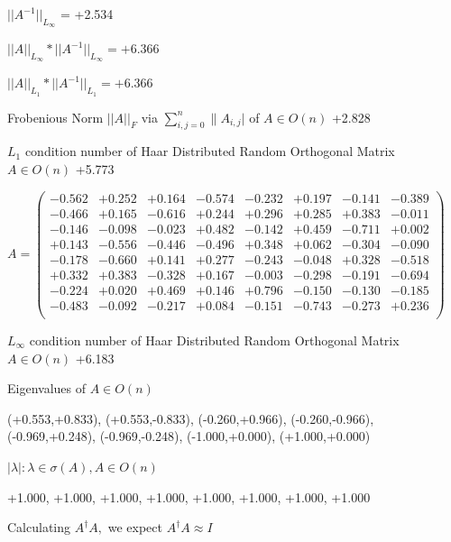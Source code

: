 \documentclass[9pt]{article}
\theoremstyle{plain}
\theoremstyle{definition}
\theoremstyle{remark}
\numberwithin{equation}{section}
\begin{document}
$||A^{-1}||_{L_{\infty}}$ = +2.534

$||A||_{L_{\infty}} * ||A^{-1}||_{L_{\infty}} = +6.366$

$||A||_{L_1} * ||A^{-1}||_{L_1} = +6.366$

Frobenious Norm  $||A||_{\textit{F}}$ via $\sum\limits_{i,j =0}^{n} \|A_{i,j}|$   of  $A \in O(n)$  +2.828

$L_1$ condition number of Haar Distributed Random Orthogonal Matrix $A \in O(n)$ +5.773

$A = \left(
\begin{array}{
cccccccc}
-0.562 & +0.252 & +0.164 & -0.574 & -0.232 & +0.197 & -0.141 & -0.389 \\
-0.466 & +0.165 & -0.616 & +0.244 & +0.296 & +0.285 & +0.383 & -0.011 \\
-0.146 & -0.098 & -0.023 & +0.482 & -0.142 & +0.459 & -0.711 & +0.002 \\
+0.143 & -0.556 & -0.446 & -0.496 & +0.348 & +0.062 & -0.304 & -0.090 \\
-0.178 & -0.660 & +0.141 & +0.277 & -0.243 & -0.048 & +0.328 & -0.518 \\
+0.332 & +0.383 & -0.328 & +0.167 & -0.003 & -0.298 & -0.191 & -0.694 \\
-0.224 & +0.020 & +0.469 & +0.146 & +0.796 & -0.150 & -0.130 & -0.185 \\
-0.483 & -0.092 & -0.217 & +0.084 & -0.151 & -0.743 & -0.273 & +0.236 \\
\end{array}
\right)$ \newline 

$L_{\infty}$ condition number of Haar Distributed Random Orthogonal Matrix $A \in O(n)$ +6.183

Eigenvalues of $A \in O(n)$

(+0.553,+0.833), (+0.553,-0.833), (-0.260,+0.966), (-0.260,-0.966), (-0.969,+0.248), (-0.969,-0.248), (-1.000,+0.000), (+1.000,+0.000)

 $|\lambda | : \lambda \in \sigma(A) , A \in O(n)$

+1.000, +1.000, +1.000, +1.000, +1.000, +1.000, +1.000, +1.000


Calculating $A^{\dag} A,$  we expect $A^{\dag} A \approx I$
\end{document}
